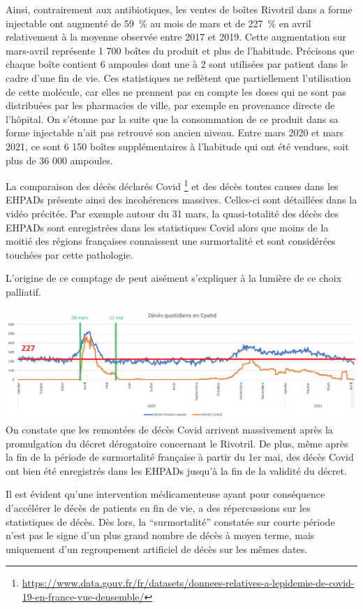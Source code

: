 \documentclass[
]{article}
\begin{document}
Ainsi, contrairement aux antibiotiques, les ventes de boîtes Rivotril
dans a forme injectable ont augmenté de 59~\% au mois de mars et de
227~\% en avril relativement à la moyenne observée entre 2017 et 2019.
Cette augmentation sur mars-avril représente 1 700 boîtes du produit et
plus de l'habitude. Précisons que chaque boîte contient 6 ampoules dont
une à 2 sont utilisées par patient dans le cadre d'une fin de vie. Ces
statistiques ne reflètent que partiellement l'utilisation de cette
molécule, car elles ne prennent pas en compte les doses qui ne sont pas
distribuées par les pharmacies de ville, par exemple en provenance
directe de l'hôpital. On s'étonne par la suite que la consommation de ce
produit dans sa forme injectable n'ait pas retrouvé son ancien niveau.
Entre mars 2020 et mars 2021, ce sont 6 150 boîtes supplémentaires à
l'habitude qui ont été vendues, soit plus de 36 000 ampoules.

La comparaison des décès déclarés Covid \footnote{\url{https://www.data.gouv.fr/fr/datasets/donnees-relatives-a-lepidemie-de-covid-19-en-france-vue-densemble/}}
et des décès toutes causes dans les EHPADs présente ainsi des
incohérences massives. Celles-ci sont détaillées dans la vidéo précitée.
Par exemple autour du 31 mars, la quasi-totalité des décès des EHPADs
sont enregistrées dans les statistiques Covid alors que moins de la
moitié des régions françaises connaissent une surmortalité et sont
considérées touchées par cette pathologie.

L'origine de ce comptage de peut aisément s'expliquer à la lumière de ce
choix palliatif.

\includegraphics[width=10.41667in,height=\textheight]{data/images/EHPAD.png}
On constate que les remontées de décès Covid arrivent massivement après
la promulgation du décret dérogatoire concernant le Rivotril. De plus,
même après la fin de la période de surmortalité française à partir du
1er mai, des décès Covid ont bien été enregistrés dans les EHPADs
jusqu'à la fin de la validité du décret.

Il est évident qu'une intervention médicamenteuse ayant pour conséquence
d'accélérer le décès de patients en fin de vie, a des répercussions sur
les statistiques de décès. Dès lors, la ``surmortalité'' constatée sur
courte période n'est pas le signe d'un plus grand nombre de décès à
moyen terme, mais uniquement d'un regroupement artificiel de décès sur
les mêmes dates.
\end{document}
